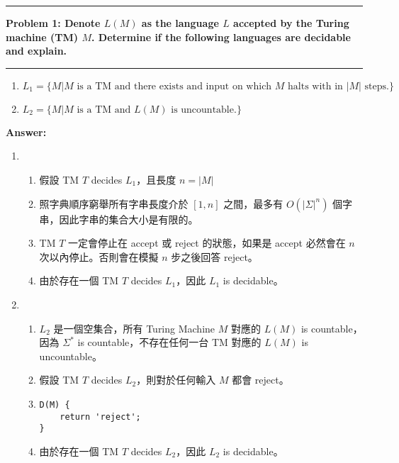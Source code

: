 \documentclass[11pt]{article}
\newcommand\question[2]{\vspace{.25in}\hrule\textbf{#1: #2}\vspace{.5em}\hrule\vspace{.10in}}
\renewcommand\part[1]{\vspace{.10in}\textbf{#1}}
\newcommand\algorithm{\vspace{.10in}\textbf{Algorithm: }}
\begin{document}
\raggedright
\newcommand\NAME{Shiang-Yun Yang 楊翔雲}  %
\newcommand\ANDREWID{R04922067}     %
\newcommand\HWNUM{3}              %



\question{Problem 1}{Denote $L(M)$ as the language $L$ accepted by the Turing machine (TM) $M$. Determine if the following languages are decidable and explain.}

\begin{enumerate}
	\item $L_1 = \{ M | M \text{ is a TM and there exists and input on which $M$ halts with in } |M| \text{ steps.} \}$
	\item $L_2 = \{ M | M \text{ is a TM and } L(M) \text{ is uncountable.} \}$
\end{enumerate}


\part{Answer:} %

\begin{enumerate}
	\item
		\begin{enumerate}
			\item 假設 TM $T$ decides $L_1$，且長度 $n = |M|$
			\item 照字典順序窮舉所有字串長度介於 $[ 1, n ]$ 之間，最多有 $O(|\Sigma|^n)$ 個字串，因此字串的集合大小是有限的。
			\item TM $T$ 一定會停止在 accept 或 reject 的狀態，如果是 accept 必然會在 $n$ 次以內停止。否則會在模擬 $n$ 步之後回答 reject。
			\item 由於存在一個 TM $T$ decides $L_1$，因此 $L_1$ is decidable。
		\end{enumerate}
	\item
		\begin{enumerate}
			\item $L_2$ 是一個空集合，所有 Turing Machine $M$ 對應的 $L(M)$ is countable，因為 $\Sigma^{\ast}$ is countable，不存在任何一台 TM 對應的 $L(M)$ is uncountable。
			\item 假設 TM $T$ decides $L_2$，則對於任何輸入 $M$ 都會 reject。
			\item \begin{lstlisting}
D(M) {
	return 'reject';
}
\end{lstlisting}
			\item 由於存在一個 TM $T$ decides $L_2$，因此 $L_2$ is decidable。
		\end{enumerate}
\end{enumerate}
\end{document}
